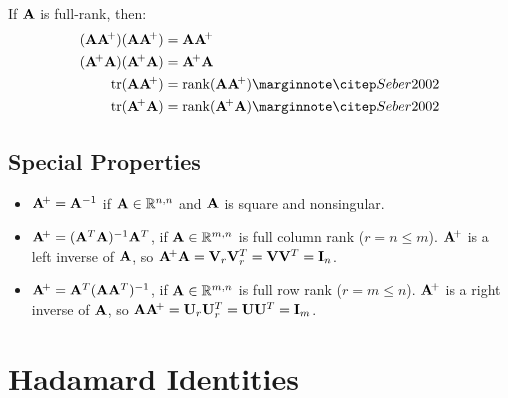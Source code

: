 If $\mathbf{A}$ is full-rank, then:
\begin{align}
(\mA\mA\pinv)(\mA\mA\pinv) &= \mA\mA\pinv                           \\
(\mA\pinv\mA)(\mA\pinv\mA) &= \mA\pinv\mA                           \\
\trace(\mA\mA\pinv)        &= \rank(\mA\mA\pinv) \eqcite{Seber2002} \\
\trace(\mA\pinv\mA)        &= \rank(\mA\pinv\mA) \eqcite{Seber2002}
\end{align}

\subsection*{Special Properties}
\begin{itemize}
\item $\mathbf{A}\!^+=\mathbf{A}^{-1}$ if $\mathbf{A}\in\mathbb{R}^{n,n}$ and $\mathbf{A}$ is square and nonsingular.
\item $\mathbf{A}\!^+=(\mathbf{A}^T\mathbf{A})^{-1}\mathbf{A}^T$, if $\mathbf{A}\in\mathbb{R}^{m,n}$ is full column rank ($r=n\le m$). $\mathbf{A}\!^+$ is a left inverse of $\mathbf{A}$, so $\mathbf{A}\!^+\mathbf{A}=\mathbf{V}_r\mathbf{V}_r^T=\mathbf{V}\mathbf{V}^T=\mathbf{I}_n$.
\item $\mathbf{A}\!^+=\mathbf{A}^T(\mathbf{A}\mathbf{A}^T)^{-1}$, if $\mathbf{A}\in\mathbb{R}^{m,n}$ is full row rank ($r=m\le n$). $\mathbf{A}\!^+$ is a right inverse of $\mathbf{A}$, so $\mathbf{A}\mathbf{A}\!^+=\mathbf{U}_r\mathbf{U}_r^T=\mathbf{U}\mathbf{U}^T=\mathbf{I}_m$.
\end{itemize} %





\section{Hadamard Identities}

